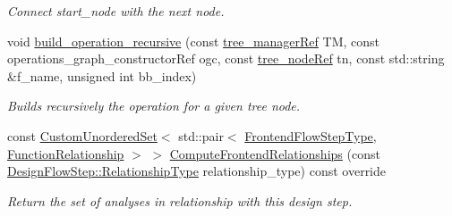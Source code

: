 \begin{DoxyCompactItemize}
\begin{DoxyCompactList}\small\item\em Connect start\+\_\+node with the next node. \end{DoxyCompactList}\item 
void \hyperlink{classoperations__cfg__computation_a15f7edea4fa3125578040172ac73c006}{build\+\_\+operation\+\_\+recursive} (const \hyperlink{tree__manager_8hpp_a96ff150c071ce11a9a7a1e40590f205e}{tree\+\_\+manager\+Ref} TM, const operations\+\_\+graph\+\_\+constructor\+Ref ogc, const \hyperlink{tree__node_8hpp_a6ee377554d1c4871ad66a337eaa67fd5}{tree\+\_\+node\+Ref} tn, const std\+::string \&f\+\_\+name, unsigned int bb\+\_\+index)
\begin{DoxyCompactList}\small\item\em Builds recursively the operation for a given tree node. \end{DoxyCompactList}\item 
const \hyperlink{classCustomUnorderedSet}{Custom\+Unordered\+Set}$<$ std\+::pair$<$ \hyperlink{frontend__flow__step_8hpp_afeb3716c693d2b2e4ed3e6d04c3b63bb}{Frontend\+Flow\+Step\+Type}, \hyperlink{classFrontendFlowStep_af7cf30f2023e5b99e637dc2058289ab0}{Function\+Relationship} $>$ $>$ \hyperlink{classoperations__cfg__computation_a8a039eb04d4aed41aba4d5f5b9e505eb}{Compute\+Frontend\+Relationships} (const \hyperlink{classDesignFlowStep_a723a3baf19ff2ceb77bc13e099d0b1b7}{Design\+Flow\+Step\+::\+Relationship\+Type} relationship\+\_\+type) const override
\begin{DoxyCompactList}\small\item\em Return the set of analyses in relationship with this design step. \end{DoxyCompactList}\end{DoxyCompactItemize}
